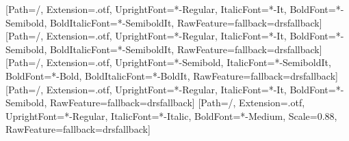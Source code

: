 \usepackage{fontspec}
\setmainfont{SourceSans3}[Path=\fontpath/, Extension=.otf, UprightFont=*-Regular, ItalicFont=*-It,
  BoldFont=*-Semibold, BoldItalicFont=*-SemiboldIt, RawFeature={fallback=drsfallback}]
\setsansfont{SourceSans3}[Path=\fontpath/, Extension=.otf, UprightFont=*-Regular, ItalicFont=*-It,
  BoldFont=*-Semibold, BoldItalicFont=*-SemiboldIt, RawFeature={fallback=drsfallback}]
\newfontfamily{}[Path=\fontpath/, Extension=.otf, UprightFont=*-Semibold, ItalicFont=*-SemiboldIt,
  BoldFont=*-Bold, BoldItalicFont=*-BoldIt, RawFeature={fallback=drsfallback}]
\newfontfamily{}[Path=\fontpath/, Extension=.otf, UprightFont=*-Regular, ItalicFont=*-It,
  BoldFont=*-Semibold, RawFeature={fallback=drsfallback}]
\setmonofont{IBMPlexMono}[Path=\fontpath/, Extension=.otf, UprightFont=*-Regular, ItalicFont=*-Italic,
  BoldFont=*-Medium, Scale=0.88, RawFeature={fallback=drsfallback}]

\usepackage{xcolor}
\color{drsink}


\usepackage[headsepline=0.4pt]{scrlayer-scrpage}
\pagestyle{scrheadings}
\clearpairofpagestyles
{}
\ohead{\docversion}
\ofoot{\pagemark}

